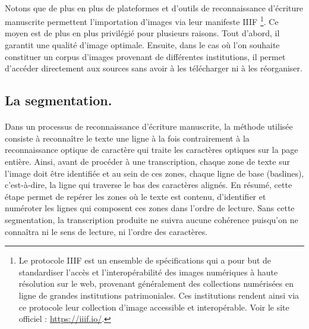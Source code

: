 \documentclass[a4paper,12pt,twoside]{book}
\begin{document}
\paragraph{}
Notons que de plus en plus de plateformes et d'outils de reconnaissance d'écriture manuscrite permettent l'importation d'images via leur manifeste IIIF \footnote{Le protocole IIIF est un ensemble de spécifications qui a pour but de standardiser l'accès et l'interopérabilité des images numériques à haute résolution sur le web, provenant généralement des collections numérisées en ligne de grandes institutions patrimoniales. Ces institutions rendent ainsi via ce protocole leur collection d'image accessible et interopérable. Voir le site officiel : \url{https://iiif.io/}.}. Ce moyen est de plus en plus privilégié pour plusieurs raisons. Tout d'abord, il garantit une qualité d'image optimale. Ensuite, dans le cas où l'on souhaite constituer un corpus d'images provenant de différentes institutions, il permet d'accéder directement aux sources sans avoir à les télécharger ni à les réorganiser. 

\subsection{La segmentation.}

\paragraph{}
Dans un processus de reconnaissance d’écriture manuscrite, la méthode utilisée consiste à reconnaître le texte une ligne à la fois contrairement à la reconnaissance optique de caractère qui traite les caractères optiques sur la page entière. Ainsi, avant de procéder à une transcription, chaque zone de texte sur l’image doit être identifiée et au sein de ces zones, chaque ligne de base (baslines), c'est-à-dire, la ligne qui traverse le bas des caractères alignés. En résumé, cette étape permet de repérer les zones où le texte est contenu, d’identifier et numéroter les lignes qui composent ces zones dans l’ordre de lecture. Sans cette segmentation, la transcription produite ne suivra aucune cohérence puisqu’on ne connaîtra ni le sens de lecture, ni l’ordre des caractères.  
\end{document}
